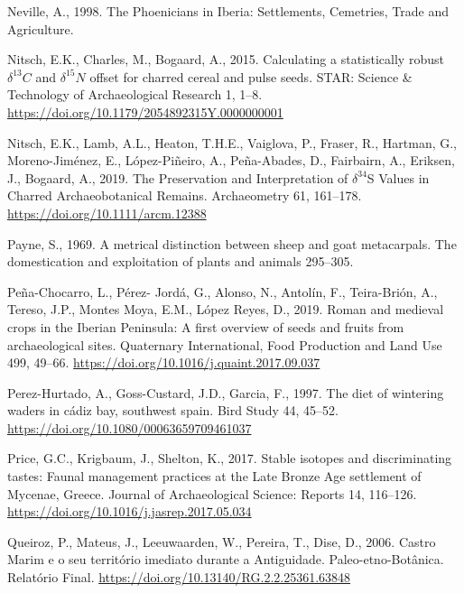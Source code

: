 \documentclass[3p]{elsarticle} %
\newlength{\cslhangindent}
\newlength{\cslentryspacingunit} %
\newenvironment{CSLReferences}[2] %
 {%
  \setlength{\parindent}{0pt}
  \ifodd #1
  \let\oldpar\par
  \def\par{\hangindent=\cslhangindent\oldpar}
  \fi
  \setlength{\parskip}{#2\cslentryspacingunit}
 }%
 {}
\begin{document}
\begin{CSLReferences}{1}{0}
\leavevmode{}%
Neville, A., 1998. The {Phoenicians} in {Iberia}: {Settlements}, {Cemetries}, {Trade} and {Agriculture}.

\leavevmode{}%
Nitsch, E.K., Charles, M., Bogaard, A., 2015. Calculating a statistically robust \(\delta ^{13}C\) and \(\delta ^{15}N\) offset for charred cereal and pulse seeds. STAR: Science \& Technology of Archaeological Research 1, 1--8. \url{https://doi.org/10.1179/2054892315Y.0000000001}

\leavevmode{}%
Nitsch, E.K., Lamb, A.L., Heaton, T.H.E., Vaiglova, P., Fraser, R., Hartman, G., Moreno-Jiménez, E., López-Piñeiro, A., Peña-Abades, D., Fairbairn, A., Eriksen, J., Bogaard, A., 2019. The {Preservation} and {Interpretation} of {\(\delta^{34}\)S Values} in {Charred Archaeobotanical Remains}. Archaeometry 61, 161--178. \url{https://doi.org/10.1111/arcm.12388}

\leavevmode{}%
Payne, S., 1969. A metrical distinction between sheep and goat metacarpals. The domestication and exploitation of plants and animals 295--305.

\leavevmode{}%
Peña-Chocarro, L., Pérez- Jordá, G., Alonso, N., Antolín, F., Teira-Brión, A., Tereso, J.P., Montes Moya, E.M., López Reyes, D., 2019. Roman and medieval crops in the {Iberian Peninsula}: {A} first overview of seeds and fruits from archaeological sites. Quaternary International, Food {Production} and {Land Use} 499, 49--66. \url{https://doi.org/10.1016/j.quaint.2017.09.037}

\leavevmode{}%
Perez-Hurtado, A., Goss-Custard, J.D., Garcia, F., 1997. The diet of wintering waders in cádiz bay, southwest spain. Bird Study 44, 45--52. \url{https://doi.org/10.1080/00063659709461037}

\leavevmode{}%
Price, G.C., Krigbaum, J., Shelton, K., 2017. Stable isotopes and discriminating tastes: {Faunal} management practices at the {Late Bronze Age} settlement of {Mycenae}, {Greece}. Journal of Archaeological Science: Reports 14, 116--126. \url{https://doi.org/10.1016/j.jasrep.2017.05.034}

\leavevmode{}%
Queiroz, P., Mateus, J., Leeuwaarden, W., Pereira, T., Dise, D., 2006. Castro {Marim} e o seu território imediato durante a {Antiguidade}. {Paleo}-etno-{Botânica}. {Relatório Final}. \url{https://doi.org/10.13140/RG.2.2.25361.63848}


\end{CSLReferences}
\end{document}
